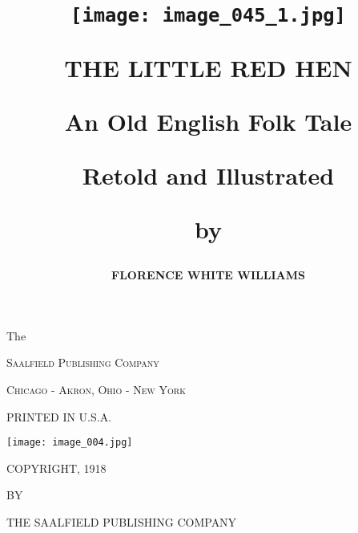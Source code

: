 \documentclass[letterpaper, 10pt, openany]{memoir}
\title{\texttt{[image: image\_045\_1.jpg]}

\Huge{\MakeUppercase{\textbf{The Little Red Hen}}}

\vspace{\onelineskip}

\normalsize{An Old English Folk Tale

\vspace{\onelineskip}
\vspace{\onelineskip}

Retold and Illustrated
\vspace{\onelineskip}

\textbf{by}}}
\author{\MakeUppercase{\textbf{Florence White Williams}}}
\date{}
\begin{document}
\maketitle

\newpage
\begin{center}
The

\textsc{Saalfield Publishing Company}

\textsc{Chicago - Akron, Ohio - New York}

\vspace{\onelineskip}

\tiny{\MakeUppercase{Printed in U.S.A.}}

\vspace{\onelineskip}

\texttt{[image: image\_004.jpg]}

\vspace{\onelineskip}

COPYRIGHT, 1918

BY

THE SAALFIELD PUBLISHING COMPANY


\end{center}
\end{document}
